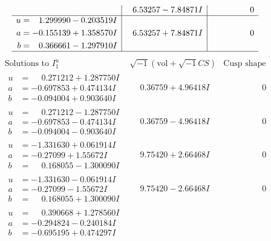 \documentclass[1p]{elsarticle_modified}
\theoremstyle{definition}
\newcommand{\I}{\sqrt{-1}}
\begin{document}
$$\begin{array}{c|c|c}
 & \phantom{-}6.53257 - 7.84871 I & \phantom{-0.000000 } 0 \\ \hline\begin{aligned}
u &= \phantom{-}1.299990 - 0.203519 I \\
a &= -0.155139 + 1.358570 I \\
b &= \phantom{-}0.366661 - 1.297910 I\end{aligned}
 & \phantom{-}6.53257 + 7.84871 I & \phantom{-0.000000 } 0\\
 \hline 
 \end{array}$$\newpage$$\begin{array}{c|c|c}  
\text{Solutions to }I^u_{1}& \I (\text{vol} + \sqrt{-1}CS) & \text{Cusp shape}\\
 \hline 
\begin{aligned}
u &= \phantom{-}0.271212 + 1.287750 I \\
a &= -0.697853 + 0.474134 I \\
b &= -0.094004 + 0.903640 I\end{aligned}
 & \phantom{-}0.36759 + 4.96418 I & \phantom{-0.000000 } 0 \\ \hline\begin{aligned}
u &= \phantom{-}0.271212 - 1.287750 I \\
a &= -0.697853 - 0.474134 I \\
b &= -0.094004 - 0.903640 I\end{aligned}
 & \phantom{-}0.36759 - 4.96418 I & \phantom{-0.000000 } 0 \\ \hline\begin{aligned}
u &= -1.331630 + 0.061914 I \\
a &= -0.27099 + 1.55672 I \\
b &= \phantom{-}0.168055 - 1.300090 I\end{aligned}
 & \phantom{-}9.75420 + 2.66468 I & \phantom{-0.000000 } 0 \\ \hline\begin{aligned}
u &= -1.331630 - 0.061914 I \\
a &= -0.27099 - 1.55672 I \\
b &= \phantom{-}0.168055 + 1.300090 I\end{aligned}
 & \phantom{-}9.75420 - 2.66468 I & \phantom{-0.000000 } 0 \\ \hline\begin{aligned}
u &= \phantom{-}0.390668 + 1.278560 I \\
a &= -0.294824 - 0.240184 I \\
b &= -0.695195 + 0.474297 I\end{aligned}

\end{array}$$
\end{document}
